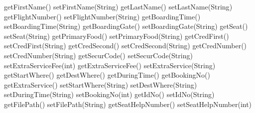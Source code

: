 \documentclass[
]{article}
\newenvironment{Shaded}{}{}
\newcommand{\BuiltInTok}[1]{#1}
\newcommand{\DataTypeTok}[1]{\textcolor[rgb]{0.56,0.13,0.00}{#1}}
\newcommand{\FunctionTok}[1]{\textcolor[rgb]{0.02,0.16,0.49}{#1}}
\newcommand{\OperatorTok}[1]{\textcolor[rgb]{0.40,0.40,0.40}{#1}}
\begin{document}
\begin{Shaded}
\begin{Highlighting}[]
     \FunctionTok{getFirstName}\OperatorTok{()}
	 \FunctionTok{setFirstName}\OperatorTok{(}\BuiltInTok{String}\OperatorTok{)}
	 \FunctionTok{getLastName}\OperatorTok{()}
	 \FunctionTok{setLastName}\OperatorTok{(}\BuiltInTok{String}\OperatorTok{)}
	 \FunctionTok{getFlightNumber}\OperatorTok{()}
	 \FunctionTok{setFlightNumber}\OperatorTok{(}\BuiltInTok{String}\OperatorTok{)}
	 \FunctionTok{getBoardingTime}\OperatorTok{()}
	 \FunctionTok{setBoardingTime}\OperatorTok{(}\BuiltInTok{String}\OperatorTok{)}
	 \FunctionTok{getBoardingGate}\OperatorTok{()}
	 \FunctionTok{setBoardingGate}\OperatorTok{(}\BuiltInTok{String}\OperatorTok{)}
	 \FunctionTok{getSeat}\OperatorTok{()}
	 \FunctionTok{setSeat}\OperatorTok{(}\BuiltInTok{String}\OperatorTok{)}
	 \FunctionTok{getPrimaryFood}\OperatorTok{()}
	 \FunctionTok{setPrimaryFood}\OperatorTok{(}\BuiltInTok{String}\OperatorTok{)}
	 \FunctionTok{getCredFirst}\OperatorTok{()}
	 \FunctionTok{setCredFirst}\OperatorTok{(}\BuiltInTok{String}\OperatorTok{)}
	 \FunctionTok{getCredSecond}\OperatorTok{()}
	 \FunctionTok{setCredSecond}\OperatorTok{(}\BuiltInTok{String}\OperatorTok{)}
	 \FunctionTok{getCredNumber}\OperatorTok{()}
	 \FunctionTok{setCredNumber}\OperatorTok{(}\BuiltInTok{String}\OperatorTok{)}
	 \FunctionTok{getSecurCode}\OperatorTok{()}
	 \FunctionTok{setSecurCode}\OperatorTok{(}\BuiltInTok{String}\OperatorTok{)}
	 \FunctionTok{setExtraServiceFee}\OperatorTok{(}\DataTypeTok{int}\OperatorTok{)}
	 \FunctionTok{getExtraServiceFee}\OperatorTok{()}
	 \FunctionTok{setExtraService}\OperatorTok{(}\BuiltInTok{String}\OperatorTok{)}
	 \FunctionTok{getStartWhere}\OperatorTok{()}
	 \FunctionTok{getDestWhere}\OperatorTok{()}
	 \FunctionTok{getDuringTime}\OperatorTok{()}
	 \FunctionTok{getBookingNo}\OperatorTok{()}
	 \FunctionTok{getExtraService}\OperatorTok{()}
	 \FunctionTok{setStartWhere}\OperatorTok{(}\BuiltInTok{String}\OperatorTok{)}
	 \FunctionTok{setDestWhere}\OperatorTok{(}\BuiltInTok{String}\OperatorTok{)}
	 \FunctionTok{setDuringTime}\OperatorTok{(}\BuiltInTok{String}\OperatorTok{)}
	 \FunctionTok{setBookingNo}\OperatorTok{(}\DataTypeTok{int}\OperatorTok{)}
	 \FunctionTok{getIdNo}\OperatorTok{()}
	 \FunctionTok{setIdNo}\OperatorTok{(}\BuiltInTok{String}\OperatorTok{)}
	 \FunctionTok{getFilePath}\OperatorTok{()}
	 \FunctionTok{setFilePath}\OperatorTok{(}\BuiltInTok{String}\OperatorTok{)}
	 \FunctionTok{getSeatHelpNumber}\OperatorTok{()}
	 \FunctionTok{setSeatHelpNumber}\OperatorTok{(}\DataTypeTok{int}\OperatorTok{)}
\end{Highlighting}
\end{Shaded}
\end{document}
